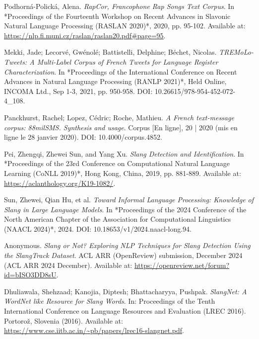 \documentclass[12pt]{article}
\begin{document}
\begin{thebibliography}{9}
Podhorná-Polická, Alena.  
\textit{RapCor, Francophone Rap Songs Text Corpus}.  
In *Proceedings of the Fourteenth Workshop on Recent Advances in Slavonic Natural Language Processing (RASLAN 2020)*, 2020, pp. 95-102.  
Available at: \url{https://nlp.fi.muni.cz/raslan/raslan20.pdf#page=95}.  %

Mekki, Jade; Lecorvé, Gwénolé; Battistelli, Delphine; Béchet, Nicolas.  
\textit{TREMoLo-Tweets: A Multi-Label Corpus of French Tweets for Language Register Characterization}.  
In *Proceedings of the International Conference on Recent Advances in Natural Language Processing (RANLP 2021)*, Held Online, INCOMA Ltd., Sep 1-3, 2021, pp. 950-958.  
DOI: 10.26615/978-954-452-072-4\_108.  

Panckhurst, Rachel; Lopez, Cédric; Roche, Mathieu.  
\textit{A French text-message corpus: 88milSMS. Synthesis and usage}.  
Corpus [En ligne], 20 | 2020 (mis en ligne le 28 janvier 2020).  
DOI: 10.4000/corpus.4852.  

Pei, Zhengqi, Zhewei Sun, and Yang Xu.  
\textit{Slang Detection and Identification}.  
In *Proceedings of the 23rd Conference on Computational Natural Language Learning (CoNLL 2019)*, Hong Kong, China, 2019, pp. 881-889.  
Available at: \url{https://aclanthology.org/K19-1082/}.  %

Sun, Zhewei, Qian Hu, et al.  
\textit{Toward Informal Language Processing: Knowledge of Slang in Large Language Models}.  
In *Proceedings of the 2024 Conference of the North American Chapter of the Association for Computational Linguistics (NAACL 2024)*, 2024.  
DOI: 10.18653/v1/2024.naacl-long.94.  

Anonymous.  
\textit{Slang or Not? Exploring NLP Techniques for Slang Detection Using the SlangTrack Dataset}.  
ACL ARR (OpenReview) submission, December 2024 (ACL ARR 2024 December).  
Available at: \url{https://openreview.net/forum?id=bISO3DD8sU}.

Dhuliawala, Shehzaad; Kanojia, Diptesh; Bhattacharyya, Pushpak.  
\textit{SlangNet: A WordNet like Resource for Slang Words}.  
In: Proceedings of the Tenth International Conference on Language Resources and Evaluation (LREC 2016).  
Portorož, Slovenia (2016).  
Available at: \url{https://www.cse.iitb.ac.in/~pb/papers/lrec16-slangnet.pdf}.


\end{thebibliography}
\end{document}
